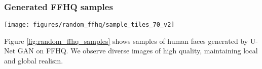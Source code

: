 \documentclass[10pt,twocolumn,letterpaper]{article}
\begin{document}
\subsubsection*{Generated FFHQ samples}
\begin{figure*}
	\begin{centering}
\vspace{-1em}
    \texttt{[image: figures/random\_ffhq/sample\_tiles\_70\_v2]}    	
	\caption{\label{fig:random_ffhq_samples} Images generated by U-Net GAN trained on FFHQ with resolution .}
\end{centering}
\end{figure*}



 Figure \ref{fig:random_ffhq_samples} shows samples of human faces generated by U-Net GAN on FFHQ. We observe diverse images of high quality, maintaining local and global realism.
\end{document}

